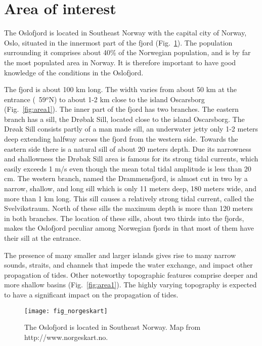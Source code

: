 \section{Area of interest}

The Oslofjord is located in Southeast Norway with the capital city of Norway, Oslo, situated in the innermost part of the fjord (Fig.~\ref{fig:area0}). The population surrounding it comprises about 40\% of the Norwegian population, and is by far the most populated area in Norway. It is therefore important to have good knowledge of the conditions in the Oslofjord. 

The fjord is about 100 km long. The width varies from about 50 km at the entrance (~59$^o$N) to about 1-2 km close to the island Oscarsborg (Fig.~\ref{fig:area1}). 
The inner part of the fjord has two branches. 
The eastern branch has a sill, the Dr{\o}bak Sill, located close to the island Oscarsborg. The Dr{\o}ak Sill consists partly of a man made sill, an underwater jetty only 1-2 meters deep extending halfway across the fjord from the western side. Towards the eastern side there is a natural sill of about 20 meters depth. Due its narrowness and shallowness the Dr{\o}bak Sill area is famous for its strong tidal currents, which easily exceeds 1 m/s even though the mean total tidal amplitude is less than 20 cm. 
The western branch, named the Drammensfjord, is almost cut in two by a narrow, shallow, and long sill which is only 11 meters deep, 180 meters wide, and more than 1 km long. This sill causes a relatively strong tidal current, called the Svelvikstraum.
North of these sills the maximum depth is more than 120 meters in both branches. 
The location of these sills, about two thirds into the fjords, makes the Oslofjord peculiar among Norwegian fjords in that most of them have their sill at the entrance.

The presence of many smaller and larger islands gives rise to many narrow sounds, straits, and channels that impede the water exchange, and impact other propagation of tides. Other noteworthy topographic features comprise deeper and more shallow basins (Fig.~\ref{fig:area1}). The highly varying topography is expected to have a significant impact on the propagation of tides.


\begin{figure}[htb]
\centering
\texttt{[image: fig\_norgeskart]}
\caption{The Oslofjord is located in Southeast Norway. Map from http://www.norgeskart.no.}
\label{fig:area0}
\end{figure}


